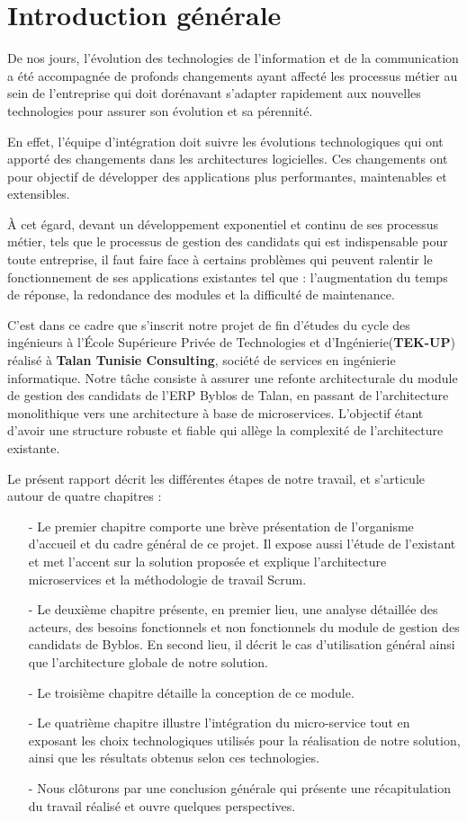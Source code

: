 \chapter*{Introduction générale}
De nos jours, l’évolution des technologies de l’information et de la communication a été accompagnée de profonds changements ayant affecté les processus métier au sein de l’entreprise qui doit dorénavant s'adapter rapidement aux nouvelles technologies pour assurer son évolution et sa pérennité.

En effet, l’équipe d'intégration doit suivre les évolutions technologiques qui ont apporté des changements dans les architectures logicielles. Ces changements ont pour objectif de développer des applications plus performantes, maintenables et extensibles. 

À cet égard, devant un développement exponentiel et continu de ses processus métier, tels que le processus de gestion des candidats qui est indispensable pour toute entreprise, il faut faire face à certains problèmes qui peuvent ralentir le fonctionnement de ses applications existantes tel que :  l’augmentation du temps de réponse, la redondance des modules et la difficulté de maintenance. 

C’est dans ce cadre que s’inscrit notre projet de fin d’études du cycle des ingénieurs à l’École Supérieure Privée de Technologies et d'Ingénierie(\textbf{TEK-UP}) réalisé à \textbf{Talan Tunisie Consulting}, société de services en ingénierie informatique. Notre tâche consiste à assurer une refonte architecturale du module de gestion des candidats de l’ERP Byblos de Talan, en passant de l’architecture monolithique vers une architecture à base de microservices. L'objectif étant d'avoir une structure robuste et fiable qui allège la complexité de l’architecture existante.

Le présent rapport décrit les différentes étapes de notre travail, et s’articule autour de quatre chapitres : 
\begin{itemize}
\item[-] Le premier chapitre comporte une brève présentation de l’organisme d’accueil et du cadre général de ce projet. Il expose aussi l’étude de l’existant et met l’accent sur la solution proposée et explique l’architecture microservices et la méthodologie de travail Scrum.
\item[-]Le deuxième chapitre présente, en premier lieu, une analyse détaillée des acteurs, des besoins fonctionnels et non fonctionnels du module de gestion des candidats de Byblos. En second lieu, il décrit le cas d’utilisation général ainsi que l’architecture globale de notre solution.
\item[-] Le troisième chapitre détaille la conception de ce module.  
\item[-] Le quatrième chapitre illustre l’intégration du micro-service tout en exposant les choix technologiques utilisés pour la réalisation de notre solution, ainsi que les résultats obtenus selon ces technologies. 
\item[-] Nous clôturons par une conclusion générale qui présente une récapitulation du travail réalisé et ouvre quelques perspectives.       
\end{itemize}
